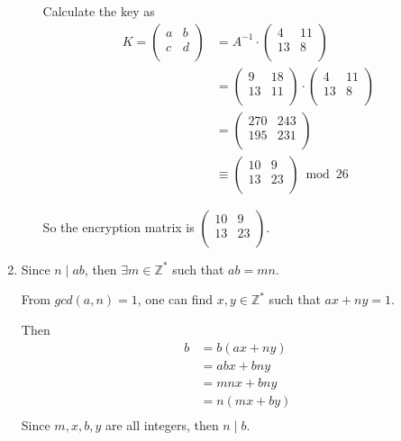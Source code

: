 \documentclass[12pt]{article}
\begin{document}
\begin{enumerate}
\begin{enumerate}
		Calculate the key as
		\begin{align*}
			K = 
			\begin{pmatrix}
				a & b\\
				c & d\\
			\end{pmatrix}
			&=
			A^{-1} \cdot 
			\begin{pmatrix}
				4 & 11\\
				13 & 8\\
			\end{pmatrix}
			\\
			&=
			\begin{pmatrix}
				9 & 18\\
				13 & 11\\
			\end{pmatrix}
			\cdot
			\begin{pmatrix}
				4 & 11\\
				13 & 8\\
			\end{pmatrix}
			\\
			&=
			\begin{pmatrix}
				270 & 243\\
				195 & 231\\
			\end{pmatrix}
			\\
			&\equiv
			\begin{pmatrix}
				10 & 9\\
				13 & 23\\
			\end{pmatrix}
			\bmod 26
		\end{align*}

		So the encryption matrix is
		$
		\begin{pmatrix}
			10 & 9\\
			13 & 23\\
		\end{pmatrix}
		$.
	\end{enumerate}

	\item Since $n \mid ab$, then $\exists m \in \mathbb{Z}^{*}$ such that $ab=mn$.

	From $gcd(a, n)=1$, one can find $x, y \in \mathbb{Z}^{*}$ such that $ax + ny = 1$.

	Then
	\begin{align*}
		b &= b(ax+ny)\\
		&= abx+bny\\
		&= mnx+bny\\
		&= n(mx+by)\\
	\end{align*}
	Since $m,x,b,y$ are all integers, then $n \mid b$.


\end{enumerate}
\end{document}
